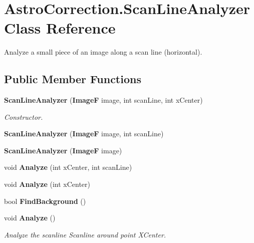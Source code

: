 \section{AstroCorrection.ScanLineAnalyzer Class Reference}
\label{class_astro_correction_1_1_scan_line_analyzer}


Analyze a small piece of an image along a scan line (horizontal).  
\subsection*{Public Member Functions}
\begin{DoxyCompactItemize}
\item 
{\bf ScanLineAnalyzer} ({\bf ImageF} image, int scanLine, int xCenter)
\begin{DoxyCompactList}\small\item\em Constructor. \item\end{DoxyCompactList}\item 
{\bf ScanLineAnalyzer} ({\bf ImageF} image, int scanLine)
\item 
{\bf ScanLineAnalyzer} ({\bf ImageF} image)
\item 
void {\bf Analyze} (int xCenter, int scanLine)
\item 
void {\bf Analyze} (int xCenter)
\item 
bool {\bf FindBackground} ()
\item 
void {\bf Analyze} ()
\begin{DoxyCompactList}\small\item\em Analyze the scanline Scanline around point XCenter. \item\end{DoxyCompactList}\end{DoxyCompactItemize}
